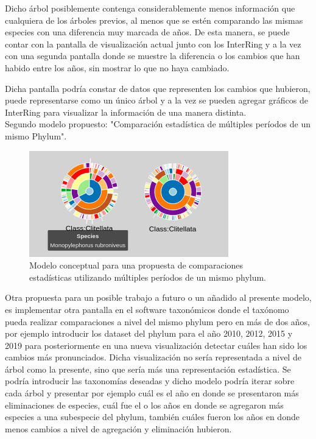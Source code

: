 \documentclass[journal]{IEEEtran}
\begin{document}
Dicho árbol posiblemente contenga considerablemente menos información que cualquiera de los árboles previos, al menos que se estén comparando las mismas especies con una diferencia muy marcada de años. De esta manera, se puede contar con la pantalla de visualización actual junto con los InterRing y a la vez con una segunda pantalla donde se muestre la diferencia o los cambios que han habido entre los años, sin mostrar lo que no haya cambiado.

Dicha pantalla podría constar de datos que representen los cambios que hubieron, puede representarse como un único árbol y a la vez se pueden agregar gráficos de InterRing para visualizar la información de una manera distinta. \\

Segundo modelo propuesto: "Comparación estadística de múltiples períodos de un mismo Phylum".
\begin{figure}
  \centering
  \includegraphics[]{interringCompare.png}
  \caption{Modelo conceptual para una propuesta de comparaciones estadísticas utilizando múltiples períodos de un mismo phylum.}
  \label{class_compare}
\end{figure}
Otra propuesta para un posible trabajo a futuro o un añadido al presente modelo, es implementar otra pantalla en el software taxonómicos donde el taxónomo pueda realizar comparaciones a nivel del mismo phylum pero en más de dos años, por ejemplo introducir los dataset del phylum para el año 2010, 2012, 2015 y 2019 para posteriormente en una nueva visualización detectar cuáles han sido los cambios más pronunciados. Dicha visualización no sería representada a nivel de árbol como la presente, sino que sería más una representación estadística. Se podría introducir las taxonomías deseadas y dicho modelo podría iterar sobre cada árbol y presentar por ejemplo cuál es el año en donde se presentaron más eliminaciones de especies, cuál fue el o los años en donde se agregaron más especies a una subespecie del phylum, también cuáles fueron los años en donde menos cambios a nivel de agregación y eliminación hubieron. 
\end{document}
